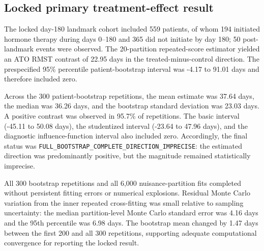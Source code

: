\subsection{Locked primary treatment-effect result}

The locked day-180 landmark cohort included 559 patients, of whom 194 initiated hormone therapy during days 0--180 and 365 did not initiate by day 180; 50 post-landmark events were observed. The 20-partition repeated-score estimator yielded an ATO RMST contrast of 22.95 days in the treated-minus-control direction. The prespecified 95\% percentile patient-bootstrap interval was -4.17 to 91.01 days and therefore included zero.

Across the 300 patient-bootstrap repetitions, the mean estimate was 37.64 days, the median was 36.26 days, and the bootstrap standard deviation was 23.03 days. A positive contrast was observed in 95.7\% of repetitions. The basic interval (-45.11 to 50.08 days), the studentized interval (-23.64 to 47.96 days), and the diagnostic influence-function interval also included zero. Accordingly, the final status was \texttt{FULL_BOOTSTRAP_COMPLETE_DIRECTION_IMPRECISE}: the estimated direction was predominantly positive, but the magnitude remained statistically imprecise.

All 300 bootstrap repetitions and all 6,000 nuisance-partition fits completed without persistent fitting errors or numerical explosions. Residual Monte Carlo variation from the inner repeated cross-fitting was small relative to sampling uncertainty: the median partition-level Monte Carlo standard error was 4.16 days and the 95th percentile was 6.98 days. The bootstrap mean changed by 1.47 days between the first 200 and all 300 repetitions, supporting adequate computational convergence for reporting the locked result.
